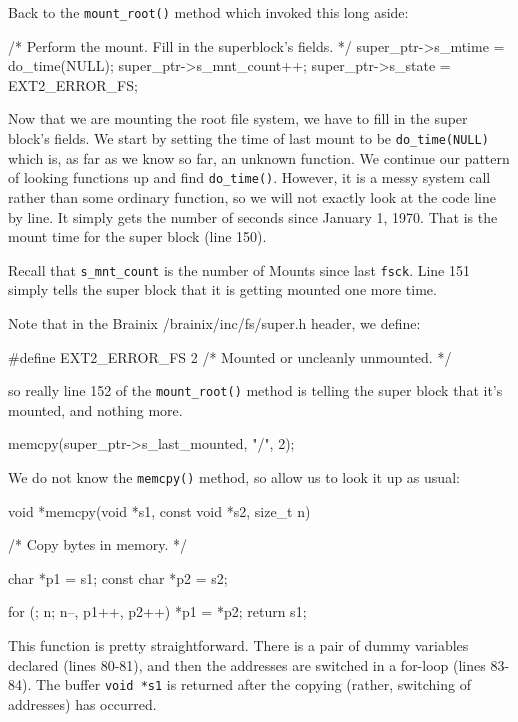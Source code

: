 Back to the \verb|mount_root()| method which invoked this long aside:
\begin{code}[numbers=left,firstnumber=149,label={[Beginning of /brainix/src/fs/mount.c]End of /brainix/src/fs/mount.c}]
      /* Perform the mount.  Fill in the superblock's fields. */
      super_ptr->s_mtime = do_time(NULL);
      super_ptr->s_mnt_count++;
      super_ptr->s_state = EXT2_ERROR_FS;
\end{code}
Now that we are mounting the root file system, we have to fill in the super block's fields. We start by setting the time of last mount to be \verb|do_time(NULL)| which is, as far as we know so far, an unknown function. We continue our pattern of looking functions up and find \verb|do_time()|. However, it is a messy system call rather than some ordinary function, so we will not exactly look at the code line by line. It simply gets the number of seconds since January 1, 1970. That is the mount time for the super block (line 150).

Recall that \verb|s_mnt_count| is the number of Mounts since last \verb|fsck|. Line 151 simply tells the super block that it is getting mounted one more time.

Note that in the Brainix /brainix/inc/fs/super.h header, we define:
\begin{code}[numbers=left,firstnumber=89,label={[Beginning of /brainix/inc/fs/super.h ]End of /brainix/inc/fs/super.h}]
 #define EXT2_ERROR_FS		2 /* Mounted or uncleanly unmounted. */
\end{code}
so really line 152 of the \verb|mount_root()| method is telling the super block that it's mounted, and nothing more.

\begin{code}[numbers=left,firstnumber=153,label={[Beginning of /brainix/src/fs/mount.c]End of /brainix/src/fs/mount.c}]
      memcpy(super_ptr->s_last_mounted, "/\0", 2);
\end{code}
We do not know the \verb|memcpy()| method, so allow us to look it up as usual: 
\begin{code}[numbers=left,firstnumber=75,label={[Beginning of /brainix/src/lib/string.c]End of /brainix/src/lib/string.c}]
 void *memcpy(void *s1, const void *s2, size_t n)
 {

 /* Copy bytes in memory. */
 
      char *p1 = s1;
      const char *p2 = s2;
 
      for (; n; n--, p1++, p2++)
           *p1 = *p2;
      return s1;
 }
\end{code}
This function is pretty straightforward. There is a pair of dummy variables declared (lines 80-81), and then the addresses are switched in a for-loop (lines 83-84). The buffer \verb|void *s1| is returned after the copying (rather, switching of addresses) has occurred.

